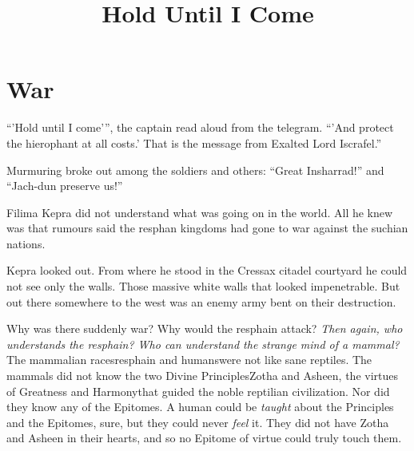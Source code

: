 \documentclass
  [a4paper,
   12pt,
   oneside
  ]%
  {article}
\title{Hold Until I Come}
\begin{document}
    \maketitle
    \tableofcontents














% 



\section{War}
``'Hold until I come'{}'', the captain read aloud from the telegram. ``'And protect the hierophant at all costs.' That is the message from Exalted Lord Iscrafel.'' 

Murmuring broke out among the soldiers and others: ``Great Insharrad!'' and ``Jach-dun preserve us!'' 

Filima Kepra did not understand what was going on in the world. 
All he knew was that rumours said the resphan kingdoms had gone to war against the suchian nations. 

Kepra looked out. From where he stood in the Cressax citadel courtyard he could not see only the walls. Those massive white walls that looked impenetrable. 
But out there somewhere to the west was an enemy army bent on their destruction.

Why was there suddenly war? Why would the resphain attack? 
\emph{Then again, who understands the resphain? Who can understand the strange mind of a mammal?} 
The mammalian races\dash{}resphain and humans\dash{}were not like sane reptiles. The mammals did not know the two Divine Principles\dash{}Zotha and Asheen, the virtues of Greatness and Harmony\dash{}that guided the noble reptilian civilization. Nor did they know any of the Epitomes. A human could be \emph{taught} about the Principles and the Epitomes, sure, but they could never \emph{feel} it. They did not have Zotha and Asheen in their hearts, and so no Epitome of virtue could truly touch them. 
\end{document}
